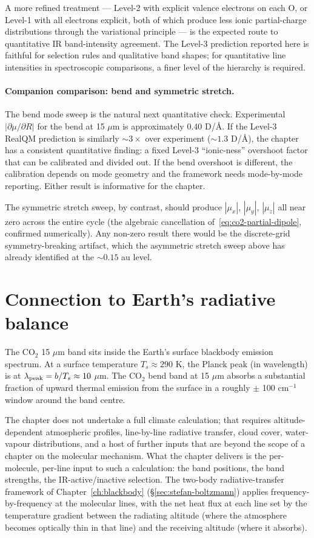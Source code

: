 A more refined treatment --- Level-2 with explicit valence electrons on each O, or Level-1 with all electrons explicit, both of which produce less ionic partial-charge distributions through the variational principle --- is the expected route to quantitative IR band-intensity agreement. The Level-3 prediction reported here is faithful for selection rules and qualitative band shapes; for quantitative line intensities in spectroscopic comparisons, a finer level of the hierarchy is required.

\paragraph{Companion comparison: bend and symmetric stretch.}
The bend mode sweep is the natural next quantitative check. Experimental $|\partial\mu/\partial R|$ for the bend at 15 $\mu$m is approximately $0.40$ D/\AA. If the Level-3 RealQM prediction is similarly $\sim 3\times$ over experiment ($\sim 1.3$ D/\AA), the chapter has a consistent quantitative finding: a fixed Level-3 ``ionic-ness'' overshoot factor that can be calibrated and divided out. If the bend overshoot is different, the calibration depends on mode geometry and the framework needs mode-by-mode reporting. Either result is informative for the chapter.

The symmetric stretch sweep, by contrast, should produce $|\mu_x|$, $|\mu_y|$, $|\mu_z|$ all near zero across the entire cycle (the algebraic cancellation of~\eqref{eq:co2-partial-dipole}, confirmed numerically). Any non-zero result there would be the discrete-grid symmetry-breaking artifact, which the asymmetric stretch sweep above has already identified at the $\sim 0.15$ au level.

\section{Connection to Earth's radiative balance}\label{sec:molrad-climate}

The CO$_2$ 15 $\mu$m band sits inside the Earth's surface blackbody emission spectrum. At a surface temperature $T_s \approx 290$ K, the Planck peak (in wavelength) is at $\lambda_{\rm peak} = b/T_s \approx 10$ $\mu$m. The CO$_2$ bend band at 15 $\mu$m absorbs a substantial fraction of upward thermal emission from the surface in a roughly $\pm$ 100 cm$^{-1}$ window around the band centre.

The chapter does not undertake a full climate calculation; that requires altitude-dependent atmospheric profiles, line-by-line radiative transfer, cloud cover, water-vapour distributions, and a host of further inputs that are beyond the scope of a chapter on the molecular mechanism. What the chapter delivers is the per-molecule, per-line input to such a calculation: the band positions, the band strengths, the IR-active/inactive selection. The two-body radiative-transfer framework of Chapter~\ref{ch:blackbody} (\S\ref{sec:stefan-boltzmann}) applies frequency-by-frequency at the molecular lines, with the net heat flux at each line set by the temperature gradient between the radiating altitude (where the atmosphere becomes optically thin in that line) and the receiving altitude (where it absorbs).


